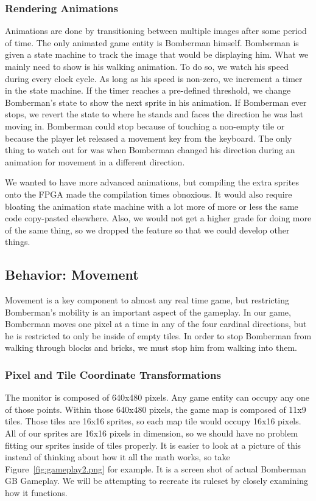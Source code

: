 \documentclass[10pt,a4paper]{article}
\begin{document}
\subsubsection{Rendering Animations}
Animations are done by transitioning between multiple images after some period of time. The only animated game entity is Bomberman himself. Bomberman is given a state machine to track the image that would be displaying him. What we mainly need to show is his walking animation. To do so, we watch his speed during every clock cycle. As long as his speed is non-zero, we increment a timer in the state machine. If the timer reaches a pre-defined threshold, we change Bomberman's state to show the next sprite in his animation. If Bomberman ever stops, we revert the state to where he stands and faces the direction he was last moving in. Bomberman could stop because of touching a non-empty tile or because the player let released a movement key from the keyboard. The only thing to watch out for was when Bomberman changed his direction during an animation for movement in a different direction.

We wanted to have more advanced animations, but compiling the extra sprites onto the FPGA made the compilation times obnoxious. It would also require bloating the animation state machine with a lot more of more or less the same code copy-pasted elsewhere. Also, we would not get a higher grade for doing more of the same thing, so we dropped the feature so that we could develop other things.

\subsection{Behavior: Movement}
Movement is a key component to almost any real time game, but restricting Bomberman's mobility is an important aspect of the gameplay. In our game, Bomberman moves one pixel at a time in any of the four cardinal directions, but he is restricted to only be inside of empty tiles. In order to stop Bomberman from walking through blocks and bricks, we must stop him from walking into them.

\subsubsection{Pixel and Tile Coordinate Transformations}
The monitor is composed of 640x480 pixels. Any game entity can occupy any one of those points. Within those 640x480 pixels, the game map is composed of 11x9 tiles. Those tiles are 16x16 sprites, so each map tile would occupy 16x16 pixels. All of our sprites are 16x16 pixels in dimension, so we should have no problem fitting our sprites inside of tiles properly. It is easier to look at a picture of this instead of thinking about how it all the math works, so take Figure~\ref{fig:gameplay2.png} for example. It is a screen shot of actual Bomberman GB Gameplay. We will be attempting to recreate its ruleset by closely examining how it functions.
\end{document}
